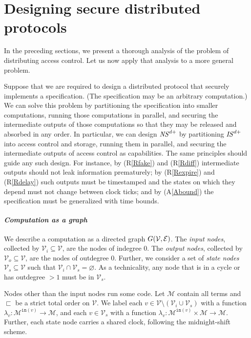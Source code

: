 \documentclass[10pt]{article}
\newcommand{\In}{\mathtt{in}}
\begin{document}
\section{Designing secure distributed protocols}\label{apply}
\noindent
In the preceding sections, we present a thorough analysis of the problem of distributing access control. Let us now apply that analysis to a more general problem.


Suppose that we are required to design a distributed protocol that securely implements a specification. (The specification may be an arbitrary computation.) We can solve this problem by partitioning the specification into smaller computations, running those computations in parallel, and securing the intermediate outputs of those computations so that they may be released and absorbed in any order. 
In particular, we can design ${\it NS}^{d+}$ by partitioning ${\it IS}^{d+}$ into access control and storage, running them in parallel, and securing the intermediate outputs of access control as capabilities. The same principles should guide any such design. For instance,  by (R\ref{Rfake}) and (R\ref{Rdiff}) intermediate outputs should not leak information prematurely;  by (R\ref{Rexpire}) and (R\ref{Rdelay}) such outputs must be timestamped and the states on which they depend must not change between clock ticks; and  by (A\ref{Abound}) the specification must be generalized with time bounds.

\paragraph{\em Computation as a graph}
\noindent
We describe a computation as a directed graph $G\cal (V,E)$. The \emph{input nodes}, collected by $\mathcal V_i \subseteq \mathcal V$, are the nodes of indegree $0$. The \emph{output nodes}, collected by $\mathcal V_o \subseteq \mathcal V$, are the nodes of outdegree $0$. Further, we consider a set of  \emph{state nodes} $\mathcal V_s \subseteq \mathcal V$ such that $\mathcal V_i \cap \mathcal V_s = \varnothing$. As a technicality, any node that is in a cycle or has outdegree $> 1$ must be in $\mathcal V_s$. 


Nodes other than the input nodes run some code. Let $\mathcal M$ contain all terms and $\sqsubset$ be a strict total order on $\mathcal V$. We label each $v \in \mathcal V \setminus (\mathcal V_i \cup \mathcal V_s)$ with a function $\lambda_v : \mathcal M^{\In(v)} \rightarrow \mathcal M$, and each $v \in \mathcal V_s$ with a function $\lambda_v : \mathcal M^{\In(v)}\times \mathcal M \rightarrow \mathcal M$. Further, each state node carries a shared clock, following the midnight-shift scheme. 
\end{document}
